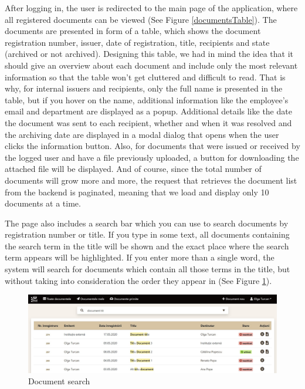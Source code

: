 After logging in, the user is redirected to the main page of the application, where all registered documents can be viewed (See Figure \ref{documentsTable}). The documents are presented in form of a table, which shows the document registration number, issuer, date of registration, title, recipients and state (archived or not archived). Designing this table, we had in mind the idea that it should give an overview about each document and include only the most relevant information so that the table won't get cluttered and difficult to read. That is why, for internal issuers and recipients, only the full name is presented in the table, but if you hover on the name, additional information like the employee's email and department are displayed as a popup. Additional details like the date the document was sent to each recipient, whether and when it was resolved and the archiving date are displayed in a modal dialog that opens when the user clicks the information button. Also, for documents that were issued or received by the logged user and have a file previously uploaded, a button for downloading the attached file will be displayed. And of course, since the total number of documents will grow more and more, the request that retrieves the document list from the backend is paginated, meaning that we load and display only 10 documents at a time.

The page also includes a search bar which you can use to search documents by registration number or title. If you type in some text, all documents containing the search term in the title will be shown and the exact place where the search term appears will be highlighted. If you enter more than a single word, the system will search for documents which contain all those terms in the title, but without taking into consideration the order they appear in (See Figure \ref{searchInline}).

\begin{figure}[H]
    \centering
    \includegraphics[width=5in]{images/app/search_inline_mix}
    \caption{Document search}
    \label{searchInline}
\end{figure}

